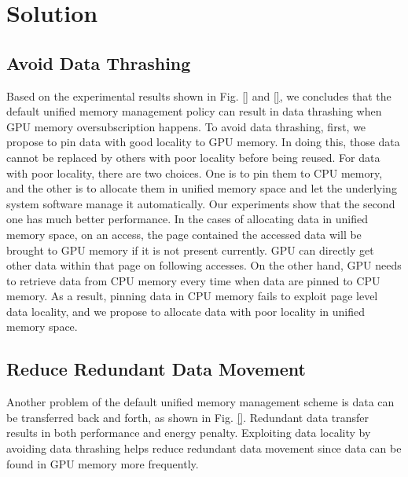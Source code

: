 \section{Solution}
\label{sect:tech}

\subsection{Avoid Data Thrashing}
\label{sect:tech:thrashing}

Based on the experimental results shown in Fig. \ref{} and \ref{}, we concludes that the default unified memory management policy can result in data thrashing when GPU memory oversubscription happens.
To avoid data thrashing, first, we propose to pin data with good locality to GPU memory.
In doing this, those data cannot be replaced by others with poor locality before being reused.
For data with poor locality, there are two choices.
One is to pin them to CPU memory, and the other is to allocate them in unified memory space and let the underlying system software manage it automatically.
Our experiments show that the second one has much better performance.
In the cases of allocating data in unified memory space, on an access, the page contained the accessed data will be brought to GPU memory if it is not present currently.
GPU can directly get other data within that page on following accesses.
On the other hand, GPU needs to retrieve data from CPU memory every time when data are pinned to CPU memory.
As a result, pinning data in CPU memory fails to exploit page level data locality, and we propose to allocate data with poor locality in unified memory space.

\subsection{Reduce Redundant Data Movement}
\label{sect:tech:transfer}

Another problem of the default unified memory management scheme is data can be transferred back and forth, as shown in Fig. \ref{}.
Redundant data transfer results in both performance and energy penalty.
Exploiting data locality by avoiding data thrashing helps reduce redundant data movement since data can be found in GPU memory more frequently.

